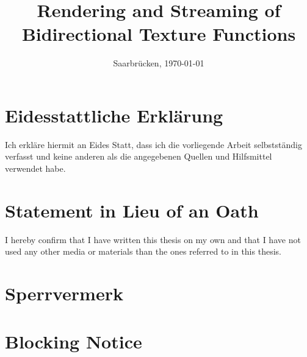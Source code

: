 \documentclass[11pt, a4paper, twoside]{Thesis}
\begin{document}
\frontmatter

\title  {Rendering and Streaming of
Bidirectional Texture Functions }

\addresses  {\groupname\\\deptname\\\univname}  %
\date       {Saarbr\"ucken, \today }
\subject    {}
\keywords   {}

\maketitle



\thispagestyle{empty}

\section*{Eidesstattliche Erkl\"{a}rung}
Ich erkl\"{a}re hiermit an Eides Statt, dass ich die vorliegende Arbeit selbstst\"{a}ndig verfasst und keine
anderen als die angegebenen Quellen und Hilfsmittel verwendet habe.

\vspace{0.60cm}
\section*{Statement in Lieu of an Oath}
I hereby confirm that I have written this thesis on my own and that I have not used any other media or
materials than the ones referred to in this thesis.
\vspace{1.5cm}

\section*{Sperrvermerk}


\vspace{0.60cm}
\section*{Blocking Notice}

\vspace{3cm}
\end{document}
